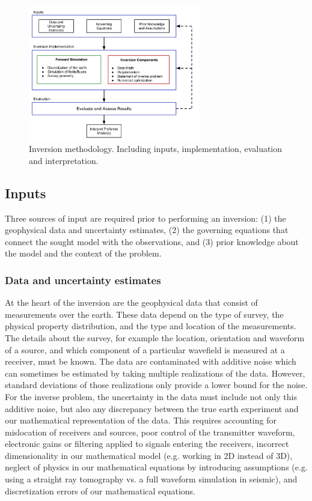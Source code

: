 \documentclass[preprint,review,3p,times,onecolumn,authoryear]{elsarticle}
\begin{document}
{%
\begin{figure}[ht!]
\centering
\includegraphics[width=7.5cm]{images/InversionWorkflowBulletsv2.png}
\caption{Inversion methodology. Including inputs, implementation, evaluation and interpretation. }
\label{fig:inversionOutline}
\end{figure}
}

\subsection{Inputs}
\label{sub:inputs}

Three sources of input are required prior to performing an inversion:
(1) the geophysical data and uncertainty estimates,
(2) the governing equations that connect the sought model with the observations, and
(3) prior knowledge about the model and the context of the problem.

\subsubsection*{Data and uncertainty estimates}

At the heart of the inversion are the geophysical data that consist of
measurements over the earth. These data depend on the type of survey,
the physical property distribution, and the type and location of
the measurements. The details about the survey, for example the location, orientation and waveform of a source, and which component
of a particular wavefield is measured at a receiver, must be known.
The data are contaminated with additive noise which can sometimes be
estimated by taking multiple realizations of the data.
However, standard deviations of those realizations only provide a lower bound for the noise.
For the
inverse problem, the uncertainty in the data must include not only this
additive noise, but also any discrepancy between the true earth experiment
and our mathematical representation of the data. This requires
accounting for mislocation of receivers and sources,
poor control of the transmitter waveform, electronic gains
or filtering applied to signals entering the receivers, incorrect
dimensionality in our mathematical model (e.g. working in 2D instead of 3D),
neglect of physics in our mathematical equations by introducing assumptions (e.g. using a straight ray tomography vs. a full waveform simulation in seismic), and discretization errors of
our mathematical equations.
\end{document}
